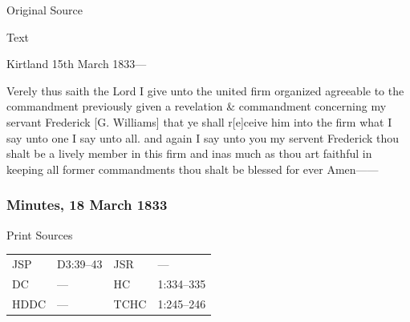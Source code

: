 			\begin{description}
				\item[Original Source]
			\end{description}
			
			
			\begin{description}
				\item[Text]
			\end{description}
			
				\begin{tightcenter}
				Kirtland 15th March 1833---
				\end{tightcenter}
				
				Verely thus saith the Lord I give unto the united firm organized agreeable to the commandment previously given a revelation \& commandment concerning my servant Frederick [G. Williams] that ye shall r[e]ceive him into the firm what I say unto one I say unto all. and again I say unto you my servent Frederick thou shalt be a lively member in this firm and inas much as thou art faithful in keeping all former commandments thou shalt be blessed for ever Amen------
				
		\subsubsection{Minutes, 18 March 1833}
			\label{EMS-1833-JS-18-MAR-1833}
		
			\begin{description}
				\item[Print Sources]
			\end{description}

				\begin{tabular}{p{0.5in}p{1in}p{0.5in}p{1in}}
				JSP	 	& D3:39--43		& JSR 		& --- \\
				DC	 	& --- 			& HC 		& 1:334--335 \\
				HDDC 	& ---			& TCHC 		& 1:245--246 \\
				\end{tabular}
			
